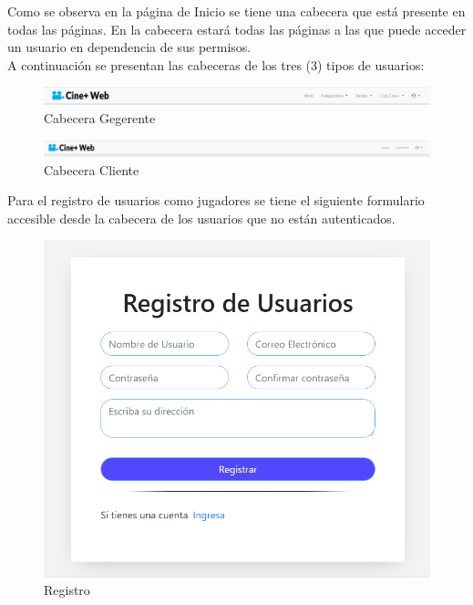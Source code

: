 Como se observa en la página de Inicio se tiene una cabecera que está presente en todas las páginas. En la cabecera estará todas las páginas a las que puede acceder un usuario en dependencia de sus permisos.\\

A continuación se presentan las cabeceras de los tres (3) tipos de usuarios:\\

\begin{figure}[h!]
	\centering
	\includegraphics[scale=0.4]{./chapters/img/header_admin.png}
	
	\label{fig:header_admin}
	\caption{Cabecera Gegerente}
\end{figure}
\begin{figure}[h!]
	\centering
	\includegraphics[scale=0.4]{./chapters/img/header_client.png}
	
	\label{fig:header_client}
	\caption{Cabecera Cliente}
\end{figure}

Para el registro de usuarios como jugadores se tiene el siguiente formulario accesible desde la cabecera de los usuarios que no están autenticados.

\begin{figure}[h!]
	\centering
	\includegraphics[scale=0.4]{./chapters/img/register.png}
	
	\label{fig:register}
	\caption{Registro}
\end{figure}

